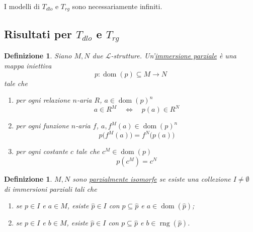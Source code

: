 \documentclass[10pt]{article}
\newcommand{\1}{\mathds{1}}
\theoremstyle{definition}%
\theoremstyle{plain}
\newtheorem{definizione}[thm]{Definizione}
\theoremstyle{remark}
\begin{document}
I modelli di \(T_{dlo}\) e \(T_{rg}\) sono necessariamente infiniti.
\subsection{Risultati per \(T_{dlo}\) e \(T_{rg}\)}
\label{sec:orga572247}

\begin{definizione}
Siano \(M,N\) due \(\mathcal{L}\)-strutture. Un'\uline{immersione parziale} è una mappa iniettiva
\begin{equation*}
p:\operatorname{dom}(p) \subseteq M\to N
\end{equation*}
tale che
\begin{enumerate}
\item per ogni relazione \(n\)-aria \(R\), \(a \in \operatorname{dom}(p)^{n}\)
\begin{equation*}
 a \in R^{M}\quad\iff\quad p(a) \in R^{N}
\end{equation*}
\item per ogni funzione \(n\)-aria \(f\), \(a, f^{M}(a) \in \operatorname{dom}(p)^{n}\)
\begin{equation*}
 p\big(f^{M}(a)\big)=f^{N}\big(p(a)\big)
\end{equation*}
\item per ogni costante \(c\) tale che \(c^{M} \in \operatorname{dom}(p)\)
\begin{equation*}
 p(c^{M})=c^{N}
\end{equation*}
\end{enumerate}
\end{definizione}

\begin{definizione}
\(M,N\) sono \uline{parzialmente isomorfe} se esiste una collezione \(I\neq\emptyset\) di immersioni parziali tali che
\begin{enumerate}
\item se \(p \in I\) e \(a \in M\), esiste \(\hat{p} \in I\) con \(p \subseteq \hat{p}\) e \(a \in \operatorname{dom}(\hat{p})\);
\item se \(p \in I\) e \(b \in M\), esiste \(\hat{p} \in I\) con \(p \subseteq \hat{p}\) e \(b \in \operatorname{rng}(\hat{p})\).
\end{enumerate}
\end{definizione}
\end{document}
